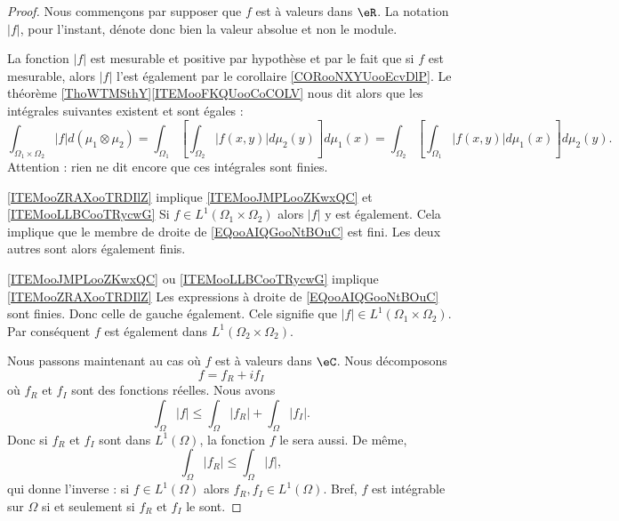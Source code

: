 \begin{proof}

    Nous commençons par supposer que \( f\) est à valeurs dans \( \eR\). La notation \( | f |\), pour l'instant,  dénote donc bien la valeur absolue et non le module.

    La fonction \( | f |\) est mesurable et positive par hypothèse et par le fait que si \( f\) est mesurable, alors \( | f |\) l'est également par le corollaire \ref{CORooNXYUooEcvDlP}. Le théorème \ref{ThoWTMSthY}\ref{ITEMooFKQUooCoCOLV} nous dit alors que les intégrales suivantes existent et sont égales :
    \begin{equation}        \label{EQooAIQGooNtBOuC}
            \int_{\Omega_1\times \Omega_2}| f |d(\mu_1\otimes \mu_2)=\int_{\Omega_1}\left[ \int_{\Omega_2}|f(x,y)|d\mu_2(y) \right]d\mu_1(x)
            =\int_{\Omega_2}\left[ \int_{\Omega_1}|f(x,y)|d\mu_1(x) \right]d\mu_2(y).
    \end{equation}
    Attention : rien ne dit encore que ces intégrales sont finies.

    \begin{subproof}
        \item[\ref{ITEMooZRAXooTRDIlZ} implique \ref{ITEMooJMPLooZKwxQC} et \ref{ITEMooLLBCooTRycwG}]
            Si \( f\in L^1(\Omega_1\times \Omega_2)\) alors \( | f |\) y est également. Cela implique que le membre de droite de \eqref{EQooAIQGooNtBOuC} est fini. Les deux autres sont alors également finis.
        \item[\ref{ITEMooJMPLooZKwxQC} ou \ref{ITEMooLLBCooTRycwG} implique \ref{ITEMooZRAXooTRDIlZ}]
            Les expressions à droite de \eqref{EQooAIQGooNtBOuC} sont finies. Donc celle de gauche également. Cele signifie que \( | f |\in L^1(\Omega_1\times \Omega_2)\). Par conséquent \( f\) est également dans \(L^1(\Omega_2\times \Omega_2) \).
    \end{subproof}

    Nous passons maintenant au cas où \( f\) est à valeurs dans \( \eC\). Nous décomposons 
    \begin{equation}
        f=f_R+if_I
    \end{equation}
    où \( f_R\) et \( f_I\) sont des fonctions réelles. Nous avons
    \begin{equation}        \label{EQooZEOAooIMwKwk}
        \int_{\Omega}| f |\leq \int_{\Omega}| f_R |+\int_{\Omega}| f_I |.
    \end{equation}
    Donc si \( f_R\) et \( f_I\) sont dans \( L^1(\Omega)\), la fonction \( f\) le sera aussi. De même,
    \begin{equation}
        \int_{\Omega}| f_R |\leq \int_{\Omega}| f |,
    \end{equation}
    qui donne l'inverse : si \( f\in L^1(\Omega)\) alors \( f_R,f_I\in L^1(\Omega)\). Bref, \( f\) est intégrable sur \( \Omega\) si et seulement si \( f_R\) et \( f_I\) le sont.


\end{proof}
